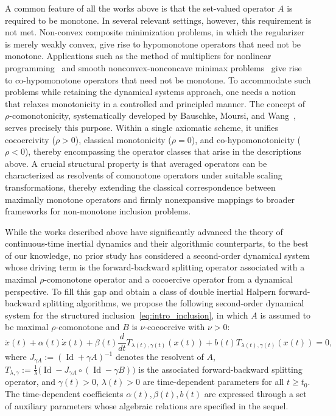 \documentclass{article}
\theoremstyle{definition}
\theoremstyle{definition}
\theoremstyle{definition}
\begin{document}
A common feature of all the works above is that the set-valued operator $A$ is required to be monotone.
In several relevant settings, however, this requirement is not met. Non-convex composite minimization problems, in which the regularizer is merely weakly convex, give rise to hypomonotone operators that need not be monotone. Applications such as the method of multipliers for nonlinear programming~\cite{combettes2004} and smooth nonconvex-nonconcave minimax problems~\cite{lee2021} give rise to co-hypomonotone operators that need not be monotone. To accommodate such problems while retaining the dynamical systems approach, one needs a notion that relaxes monotonicity in a controlled and principled manner. The concept of $\rho$-comonotonicity, systematically developed by Bauschke, Moursi, and Wang~\cite{bauschke2021generalized}, serves precisely this purpose. Within a single axiomatic scheme, it unifies cocoercivity ($\rho>0$), classical monotonicity ($\rho=0$), and co-hypomonotonicity ($\rho<0$), thereby encompassing the operator classes that arise in the descriptions above.
A crucial structural property is that averaged operators can be characterized as resolvents of comonotone operators under suitable scaling transformations, thereby extending the classical correspondence between maximally monotone operators and firmly nonexpansive mappings to broader frameworks for non-monotone inclusion problems.

While the works described above have significantly advanced the theory of continuous-time inertial dynamics and their algorithmic counterparts, to the best of our knowledge, no prior study has considered a second-order dynamical system whose driving term is the forward-backward splitting operator associated with a maximal $\rho$-comonotone operator and a cocoercive operator from a dynamical perspective. To fill this gap and obtain a class of double inertial Halpern forward-backward splitting algorithms, we propose the following second-order dynamical system for the structured inclusion~\eqref{eq:intro_inclusion}, in which $A$ is assumed to be maximal $\rho$-comonotone and $B$ is $\nu$-cocoercive with $\nu>0$:
\begin{equation*}
\ddot{x}(t)+\alpha(t)\dot{x}(t)+\beta(t)\frac{d}{dt}T_{\lambda(t),\gamma(t)}(x(t))+b(t)T_{\lambda(t),\gamma(t)}(x(t))=0,
\end{equation*}
where $J_{\gamma A}:=(\operatorname{Id}+\gamma A)^{-1}$ denotes the resolvent of $A$, $T_{\lambda,\gamma}:=\frac{1}{\lambda}\bigl(\operatorname{Id}-J_{\gamma A}\circ(\operatorname{Id}-\gamma B)\bigr)$ is the associated forward-backward splitting operator, and $\gamma(t)>0$, $\lambda(t)>0$ are time-dependent parameters for all $t\geq t_{0}$. The time-dependent coefficients $\alpha(t),\beta(t),b(t)$ are expressed through a set of auxiliary parameters whose algebraic relations are specified in the sequel.
\end{document}

